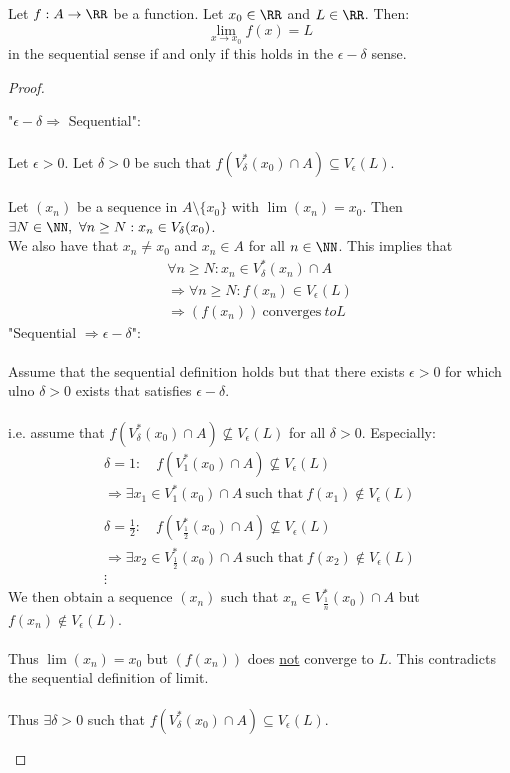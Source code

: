 \documentclass[class=scrartcl, crop=false]{standalone}
\begin{document}
\begin{theorem}
  Let $f: A \to \RR$ be a function. Let $x_0 \in \RR$ and $L \in \RR$. Then:
  \[
    \lim_{x\to x_0}f(x) = L
  \]
  in the sequential sense if and only if this holds in the $\epsilon-\delta$ sense.
  \begin{proof}
    \begin{enumerate}
      \ii[]
      \ii
      "$\epsilon-\delta \Rightarrow$ Sequential":
      \\\\
      Let $\epsilon > 0$. Let $\delta > 0$ be such that $f(V_\delta^*(x_0) \cap A) \subseteq V_\epsilon(L)$.
      \\\\
      Let $(x_n)$ be a sequence in $A \setminus \{x_0\}$ with $\lim(x_n) = x_0$. Then $\exists N \in \NN,\ \forall n \geq N : x_n \in V_\delta(x_0)$.
      \\
      We also have that $x_n \neq x_0$ and $x_n \in A$ for all $n \in \NN$. This implies that 
      \begin{gather*}
        \forall n \geq N : x_n \in V_\delta^*(x_n) \cap A \\
        \Rightarrow
        \forall n \geq N : f(x_n) \in V_\epsilon(L) \\
        \Rightarrow
        (f(x_n)) \ \text{converges} \  to L
      \end{gather*} 
      \ii
      "Sequential $\Rightarrow \epsilon-\delta$":
      \\\\
      Assume that the sequential definition holds but that there exists $\epsilon > 0$ for which ul{no} $\delta > 0$ exists that satisfies $\epsilon-\delta$.
      \\\\
      i.e. assume that $f(V_\delta^*(x_0)\cap A) \not\subseteq V_\epsilon(L)$ for all $\delta >0$. Especially: 
      \begin{gather*}
        \delta = 1: \quad f(V_1^*(x_0) \cap A) \not\subseteq V_\epsilon(L) \\
        \Rightarrow \exists x_1 \in V_1^*(x_0) \cap A \ \text{such that} \ f(x_1) \notin V_\epsilon(L)
        \\\\
        \delta = \frac{1}{2}: \quad f(V_{\frac{1}{2}}^*(x_0) \cap A) \not\subseteq V_\epsilon(L) \\
        \Rightarrow \exists x_2 \in V_{\frac{1}{2}}^*(x_0) \cap A \ \text{such that} \ f(x_2) \notin V_\epsilon(L) \\
        \vdots
      \end{gather*}
      We then obtain a sequence $(x_n)$ such that $x_n \in V_{\frac{1}{n}}^*(x_0) \cap A$ but $f(x_n) \notin V_\epsilon(L)$.
      \\\\
      Thus $\lim(x_n) = x_0$ but $(f(x_n))$ does \ul{not} converge to $L$. This contradicts the sequential definition of limit.
      \\\\
      Thus $\exists \delta > 0$ such that $f(V_\delta^*(x_0) \cap A) \subseteq V_\epsilon(L)$.
    \end{enumerate} 
  \end{proof} 
\end{theorem} 
\end{document}
